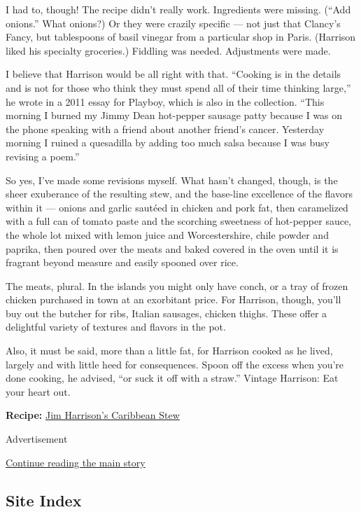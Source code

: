 I had to, though! The recipe didn't really work. Ingredients were
missing. (``Add onions.'' What onions?) Or they were crazily specific
--- not just that Clancy's Fancy, but tablespoons of basil vinegar from
a particular shop in Paris. (Harrison liked his specialty groceries.)
Fiddling was needed. Adjustments were made.

I believe that Harrison would be all right with that. ``Cooking is in
the details and is not for those who think they must spend all of their
time thinking large,'' he wrote in a 2011 essay for Playboy, which is
also in the collection. ``This morning I burned my Jimmy Dean hot-pepper
sausage patty because I was on the phone speaking with a friend about
another friend's cancer. Yesterday morning I ruined a quesadilla by
adding too much salsa because I was busy revising a poem.''

So yes, I've made some revisions myself. What hasn't changed, though, is
the sheer exuberance of the resulting stew, and the base-line excellence
of the flavors within it --- onions and garlic sautéed in chicken and
pork fat, then caramelized with a full can of tomato paste and the
scorching sweetness of hot-pepper sauce, the whole lot mixed with lemon
juice and Worcestershire, chile powder and paprika, then poured over the
meats and baked covered in the oven until it is fragrant beyond measure
and easily spooned over rice.

The meats, plural. In the islands you might only have conch, or a tray
of frozen chicken purchased in town at an exorbitant price. For
Harrison, though, you'll buy out the butcher for ribs, Italian sausages,
chicken thighs. These offer a delightful variety of textures and flavors
in the pot.

Also, it must be said, more than a little fat, for Harrison cooked as he
lived, largely and with little heed for consequences. Spoon off the
excess when you're done cooking, he advised, ``or suck it off with a
straw.'' Vintage Harrison: Eat your heart out.

\textbf{Recipe:}
\href{https://cooking.nytimes3xbfgragh.onion/recipes/1018697-jim-harrisons-caribbean-stew}{Jim
Harrison's Caribbean Stew}

Advertisement

\protect\hyperlink{after-bottom}{Continue reading the main story}

\hypertarget{site-index}{%
\subsection{Site Index}\label{site-index}}

